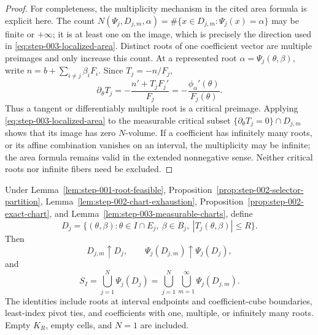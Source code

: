 \begin{proof}
For completeness, the multiplicity mechanism in the cited area formula is
explicit here.  The count
$N(\Psi_j,D_{j,m},\alpha)=\#\{x\in D_{j,m}:\Psi_j(x)=\alpha\}$ may be
finite or $+\infty$; it is at least one on the image, which is precisely the
direction used in \eqref{eq:step-003-localized-area}.  Distinct roots of one
coefficient vector are multiple preimages and only increase this count.  At
a represented root $\alpha=\Psi_j(\theta,\beta)$, write
$n=b+\sum_{i\neq j}\beta_iF_i$.  Since $T_j=-n/F_j$,
\begin{equation}
\partial_\theta T_j
=-\frac{n'+T_jF_j'}{F_j}
=-\frac{\phi_\alpha'(\theta)}{F_j(\theta)}.
\label{eq:step-003-critical-root}
\end{equation}
Thus a tangent or differentiably multiple root is a critical preimage.
Applying \eqref{eq:step-003-localized-area} to the measurable critical
subset $\{\partial_\theta T_j=0\}\cap D_{j,m}$ shows that its image has
zero $N$-volume.  If a coefficient has infinitely many roots, or its affine
combination vanishes on an interval, the multiplicity may be infinite;
the area formula remains valid in the extended nonnegative sense.  Neither
critical roots nor infinite fibers need be excluded.
\end{proof}

\begin{lemma}
\label{lem:step-003-exact-coverage}
Under Lemma~\ref{lem:step-001-root-feasible},
Proposition~\ref{prop:step-002-selector-partition},
Lemma~\ref{lem:step-002-chart-exhaustion},
Proposition~\ref{prop:step-002-exact-chart}, and
Lemma~\ref{lem:step-003-measurable-charts}, define
\begin{equation}
D_j
=\{(\theta,\beta):
\theta\in I\cap E_j,\ \beta\in B_j,\
|T_j(\theta,\beta)|\leq R\}.
\label{eq:step-003-full-domain}
\end{equation}
Then
\begin{equation}
D_{j,m}\uparrow D_j,
\qquad
\Psi_j(D_{j,m})\uparrow\Psi_j(D_j),
\label{eq:step-003-nested-images}
\end{equation}
and
\begin{equation}
S_I
=\bigcup_{j=1}^N\Psi_j(D_j)
=\bigcup_{j=1}^N\bigcup_{m=1}^{\infty}\Psi_j(D_{j,m}).
\label{eq:step-003-exact-coverage}
\end{equation}
The identities include roots at interval endpoints and coefficient-cube
boundaries, least-index pivot ties, and coefficients with one, multiple, or
infinitely many roots.  Empty $K_R$, empty cells, and $N=1$ are included.
\end{lemma}

